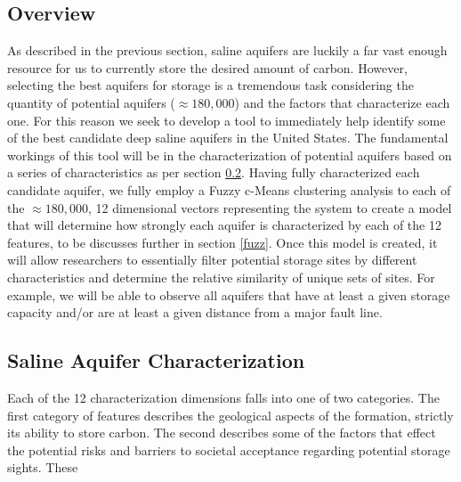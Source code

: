\documentclass[a4paper, 12pt]{article}
\begin{document}
\subsection{Overview}
As described in the previous section, saline aquifers are luckily a far vast enough resource for us to currently store the desired amount of carbon. However, selecting the best aquifers for storage is a tremendous task considering the quantity of potential aquifers ($\approx180,000$) and the factors that characterize each one. For this reason we seek to develop a tool to immediately help identify some of the best candidate deep saline aquifers in the United States. 
The fundamental workings of this tool will be in the characterization of potential aquifers based on a series of characteristics as per section \ref{wellchar}. Having fully characterized each candidate aquifer, we fully employ a Fuzzy c-Means clustering analysis to each of the $\approx180,000$, 12 dimensional vectors representing the system to create a model that will determine how strongly each aquifer is characterized by each of the 12 features, to be discusses further in section \ref{fuzz}. Once this model is created, it will allow researchers to essentially filter potential storage sites by different characteristics and determine the relative similarity of unique sets of sites. For example, we will be able to observe all aquifers that have at least a given storage capacity and/or are at least a given distance from a major fault line.  

\subsection{Saline Aquifer Characterization} \label{wellchar}
Each of the 12 characterization dimensions falls into one of two categories. The first category of features describes the geological aspects of the formation, strictly its ability to store carbon. The second describes some of the factors that effect the potential risks and barriers to societal acceptance regarding potential storage sights. These 
\end{document}
